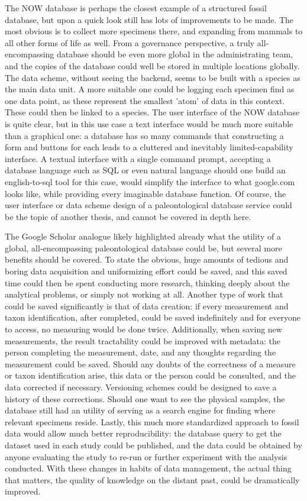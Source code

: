 \documentclass{article}
\begin{document}
The NOW database \cite{Žliobaitė2023} is perhaps the closest example of a structured fossil database, but upon a quick look still has lots of improvements to be made. The most obvious is to collect more specimens there, and expanding from mammals to all other forms of life as well. From a governance perspective, a truly all-encompassing database should be even more global in the administrating team, and the copies of the database could well be stored in multiple locations globally. The data scheme, without seeing the backend, seems to be built with a species as the main data unit. A more suitable one could be logging each specimen find as one data point, as these represent the smallest 'atom' of data in this context. These could then be linked to a species. The user interface of the NOW database is quite clear, but in this use case a text interface would be much more suitable than a graphical one: a database has so many commands that constructing a form and buttons for each leads to a cluttered and inevitably limited-capability interface. A textual interface with a single command prompt, accepting a database language such as SQL or even natural language should one build an english-to-sql tool for this case, would simplify the interface to what google.com looks like, while providing every imaginable database function. Of course, the user interface or data scheme design of a paleontological database service could be the topic of another thesis, and cannot be covered in depth here.

The Google Scholar analogue likely highlighted already what the utility of a global, all-encompassing paleontological database could be, but several more benefits should be covered. To state the obvious, huge amounts of tedious and boring data acquisition and uniformizing effort could be saved, and this saved time could then be spent conducting more research, thinking deeply about the analytical problems, or simply not working at all. Another type of work that could be saved significantly is that of data creation: if every measurement and taxon identification, after completed, could be saved indefinitely and for everyone to access, no measuring would be done twice. Additionally, when saving new measurements, the result tractability could be improved with metadata: the person completing the measurement, date, and any thoughts regarding the measurement could be saved. Should any doubts of the correctness of a measure or taxon identification arise, this data or the person could be consulted, and the data corrected if necessary. Versioning schemes could be designed to save a history of these corrections. Should one want to see the physical samples, the database still had an utility of serving as a search engine for finding where relevant specimens reside. Lastly, this much more standardized approach to fossil data would allow much better reproducibility: the database query to get the dataset used in each study could be published, and the data could be obtained by anyone evaluating the study to re-run or further experiment with the analysis conducted. With these changes in habits of data management, the actual thing that matters, the quality of knowledge on the distant past, could be dramatically improved.
\end{document}
